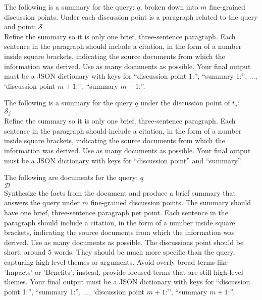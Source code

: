 \begin{prompt}[title={Prompt \thetcbcounter: Incremental Summarization Prompt (Self-Refine Summary) (\cref{subsection:summary})}, label=prompt:i2]
The following is a summary for the query: $q$, broken down into $m$ fine-grained discussion points. Under each discussion point is a paragraph related to the query and point:
$\mathcal{S}$ \\
Refine the summary so it is only one brief, three-sentence paragraph. Each sentence in the paragraph should include a citation, in the form of a number inside square brackets, indicating the source documents from which the information was derived. Use as many documents as possible. Your final output must be a JSON dictionary with keys for ``discussion point 1:'', ``summary 1:'', ..., `discussion point $m+1$:'', ``summary $m+1$:''.
\end{prompt}

\begin{prompt}[title={Prompt \thetcbcounter: Incremental Summarization Prompt (Self-Refine Topic Paragraph) (\cref{subsection:summary})}, label=prompt:i3]
The following is a summary for the query $q$ under the discussion point of $t_j$:\\
$\mathcal{S}_j$ \\
Refine the summary so it is only one brief, three-sentence paragraph. Each sentence in the paragraph should include a citation, in the form of a number inside square brackets, indicating the source documents from which the information was derived. Use as many documents as possible. Your final output must be a JSON dictionary with keys for ``discussion point'' and ``summary''. 
\end{prompt}

\clearpage

\begin{prompt}[title={Prompt \thetcbcounter: Cluster Summarization Prompt (\cref{subsection:summary})}, label=prompt:cluster]
The following are documents for the query: $q$\\
$\mathcal{D}$\\
Synthesize the facts from the document and produce a brief summary that answers the query under $m$ fine-grained discussion points. The summary should have one brief, three-sentence paragraph per point. Each sentence in the paragraph should include a citation, in the form of a number inside square brackets, indicating the source documents from which the information was derived. Use as many documents as possible. The discussions point should be short, around 5 words. They should be much more specific than the query, capturing high-level themes or arguments. Avoid overly broad terms like 'Impacts' or 'Benefits'; instead, provide focused terms that are still high-level themes. Your final output must be a JSON dictionary with keys for ``discussion point 1:'', ``summary 1:'', ..., `discussion point $m+1$:'', ``summary $m+1$:''.
\end{prompt}

